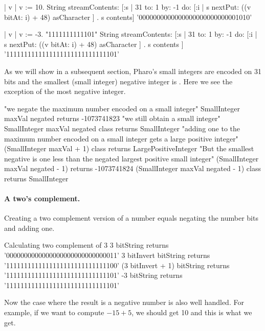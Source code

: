 \documentclass[a4paper,10pt,twoside]{book}
\begin{document}
\begin{code}{}
| v |
v := 10. 
String streamContents: [:s | 
	31 to: 1 by: -1 do: [:i | s nextPut: ((v bitAt: i) + 48) asCharacter   ] .
	s contents] 
	 '0000000000000000000000000001010'

| v |
v := -3.  "1111111111101"
String streamContents: [:s | 
	31 to: 1 by: -1 do: [:i | s nextPut: ((v bitAt: i) + 48) asCharacter   ] .
	s contents ]
	 '1111111111111111111111111111101' 
\end{code}
	
As we will show in a subsequent section, Pharo's small integers are encoded on 31 bits and the smallest (small integer) negative
integer is . Here we see the exception of the most negative integer.



\begin{code}{} 
"we negate the maximum number encoded on a small integer"
SmallInteger maxVal negated	 
	  	returns -1073741823
"we still obtain a small integer"		
SmallInteger maxVal negated class
		returns SmallInteger
"adding one to the maximum number encoded on a small integer gets a large positive integer"
(SmallInteger maxVal + 1) class
		returns LargePositiveInteger		
"But the smallest negative is one less than the negated largest positive small integer"		
(SmallInteger maxVal negated - 1) 
		returns -1073741824 
(SmallInteger maxVal negated - 1) class 
		returns SmallInteger 		 
\end{code}


\paragraph{A two's complement.}

Creating a two complement version of a number equals negating the number bits and adding one.
\begin{code}{Calculating two complement of 3}
3 bitString 
	returns '0000000000000000000000000000011'
3 bitInvert bitString 
	returns '1111111111111111111111111111100'
(3 bitInvert + 1) bitString 
	returns '1111111111111111111111111111101'
-3 bitString 
	returns '1111111111111111111111111111101'
\end{code}


Now the case where the result is a negative number is also well handled. For example, if we want to compute $-15 + 5$, we should get 10 and this is what we get.
\end{document}
